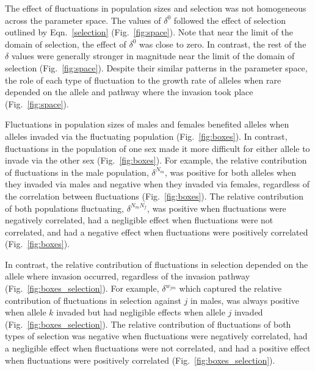 \documentclass[12pt]{article}
\begin{document}
The effect of fluctuations in population sizes and selection was not homogeneous across the parameter space. The values of $\delta^{0}$ followed the effect of selection outlined by Eqn.~\ref{selection} (Fig.~\ref{fig:space}). Note that near the limit of the domain of selection, the effect of $\delta^{0}$ was close to zero. In contrast, the rest of the $\delta$ values were generally stronger in magnitude near the limit of the domain of selection  (Fig.~\ref{fig:space}). Despite their similar patterns in the parameter space, the role of each type of fluctuation to the growth rate of alleles when rare depended on the allele and pathway where the invasion took place (Fig.~\ref{fig:space}).

Fluctuations in population sizes of males and females benefited alleles when alleles invaded via the fluctuating population (Fig.~\ref{fig:boxes}). In contrast, fluctuations in the population of one sex made it more difficult for either allele to invade via the other sex (Fig.~\ref{fig:boxes}). For example, the relative contribution of fluctuations in the male population, $\delta^{N_{m}}$, was positive for both alleles when they invaded via males and negative when they invaded via females, regardless of the correlation between fluctuations (Fig.~\ref{fig:boxes}). The relative contribution of both populations fluctuating,  $\delta^{N_{m}N_{f}}$, was positive when fluctuations were negatively correlated, had a negligible effect when fluctuations were not correlated, and had a negative effect when fluctuations were positively correlated (Fig.~\ref{fig:boxes}).

In contrast, the relative contribution of fluctuations in selection depended on the allele where invasion occurred, regardless of the invasion pathway (Fig.~\ref{fig:boxes_selection}). For example, $\delta^{w_{jm}}$ which captured the relative contribution of fluctuations in selection against $j$ in males, was always positive when allele $k$ invaded but had negligible effects when allele $j$ invaded (Fig.~\ref{fig:boxes_selection}). The relative contribution of fluctuations of both types of selection was negative when fluctuations were negatively correlated, had a negligible effect when fluctuations were not correlated, and had a positive effect when fluctuations were positively correlated (Fig.~\ref{fig:boxes_selection}).
\end{document}
